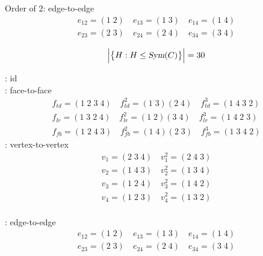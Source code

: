 \begin{frame}{}

  \begin{center}
	Order of $2$: edge-to-edge 
	\begin{align*}
	  e_{12} = (1\;2) \quad e_{13} = (1\;3) \quad e_{14} = (1\;4) \\
	  e_{23} = (2\;3) \quad e_{24} = (2\;4) \quad e_{34} = (3\;4)
	\end{align*}
  \end{center}
\end{frame}

\begin{frame}{}

  \[
	\Big\lvert \big\{H: H \le \textsl{Sym}(C)\big\} \Big\rvert = 30
  \]
\end{frame}

\begin{frame}{}
\end{frame}

\begin{frame}{}
  \begin{center}
	: id  \\[6pt]

	: face-to-face 
	\begin{align*} 
	  f_{td} = (1\;2\;3\;4) \quad f_{td}^{2} = (1\;3) (2\;4) \quad f_{td}^{3} = (1\;4\;3\;2) \\
	  f_{lr} = (1\;3\;2\;4) \quad f_{lr}^{2} = (1\;2) (3\;4) \quad f_{lr}^{3} = (1\;4\;2\;3) \\
	  f_{fb} = (1\;2\;4\;3) \quad f_{fb}^{2} = (1\;4) (2\;3) \quad f_{fb}^{3} = (1\;3\;4\;2)
	\end{align*}
	: vertex-to-vertex 
	\begin{align*}
	  v_{1} = (2\;3\;4) \quad v_{1}^{2} = (2\;4\;3) \\
	  v_{2} = (1\;4\;3) \quad v_{2}^{2} = (1\;3\;4) \\
	  v_{3} = (1\;2\;4) \quad v_{3}^{2} = (1\;4\;2) \\
	  v_{4} = (1\;2\;3) \quad v_{4}^{2} = (1\;3\;2) \\
	\end{align*}

	\vspace{-0.50cm}
	: edge-to-edge 
	\begin{align*}
	  e_{12} = (1\;2) \quad e_{13} = (1\;3) \quad e_{14} = (1\;4) \\
	  e_{23} = (2\;3) \quad e_{24} = (2\;4) \quad e_{34} = (3\;4)
	\end{align*}
  \end{center}
\end{frame}

